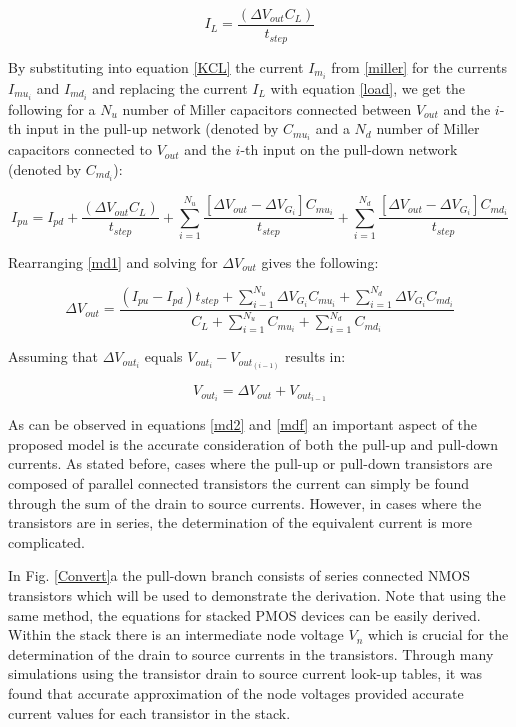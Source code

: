 \begin{equation} \label{load}
I_L = \frac{(\Delta V_{out}C_L)}{t_{step}}
\end{equation}

By substituting into equation \ref{KCL} the current $I_{m_i}$ from \ref{miller} for the currents $I_{mu_i}$ and $I_{md_i}$ and replacing the current $I_L$ with equation \ref{load}, we get the following for a $N_u$ number of Miller capacitors connected between $V_{out}$ and the $i$-th input in the pull-up network (denoted by $C_{mu_i}$ and a $N_d$ number of Miller capacitors connected to $V_{out}$ and the $i$-th input on the pull-down network (denoted by $C_{md_i}$): 

\begin{equation} \label{md1}
I_{pu} = I_{pd} + \frac{(\Delta V_{out}C_L)}{t_{step}} + \sum_{i=1}^{N_u} \frac{[\Delta V_{out} - \Delta V_{G_i}]C_{mu_i}}{t_{step}} + \sum_{i=1}^{N_d} \frac{[\Delta V_{out} - \Delta V_{G_i}]C_{md_i}}{t_{step}}
\end{equation} 

Rearranging \ref{md1} and solving for $\Delta V_{out}$ gives the following:

\begin{equation} \label{md2}
\Delta V_{out} = \frac{(I_{pu}-I_{pd})t_{step} + \sum_{i-1}^{N_u} \Delta V_{G_i}C_{mu_i} + \sum_{i=1}^{N_d} \Delta V_{G_i}C_{md_i}}{C_L + \sum_{i=1}^{N_u}C_{mu_i} + \sum_{i=1}^{N_d}C_{md_i}}
\end{equation}

Assuming that $\Delta V_{out_i}$ equals $V_{out_i} - V_{out_{(i-1)}}$ results in:

\begin{equation} \label{mdf}
V_{out_i} = \Delta V_{out} + V_{out_{i-1}}
\end{equation}

As can be observed in equations \ref{md2} and \ref{mdf} an important aspect of the proposed model is the accurate consideration of both the pull-up and pull-down currents. As stated before, cases where the pull-up or pull-down transistors are composed of parallel connected transistors the current can simply be found through the sum of the drain to source currents. However, in cases where the transistors are in series, the determination of the equivalent current is more complicated.

In Fig. \ref{Convert}a the pull-down branch consists of series connected NMOS transistors which will be used to demonstrate the derivation. Note that using the same method, the equations for stacked PMOS devices can be easily derived. Within the stack there is an intermediate node voltage $V_n$ which is crucial for the determination of the drain to source currents in the transistors. Through many simulations using the transistor drain to source current look-up tables, it was found that accurate approximation of the node voltages provided accurate current values for each transistor in the stack. 


